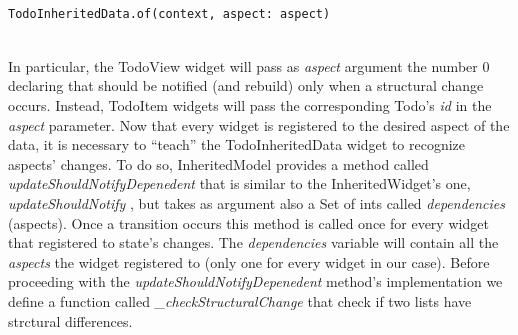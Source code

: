 \begin{code}
\label{code:2.47}
\begin{verbatim}

TodoInheritedData.of(context, aspect: aspect)
\end{verbatim}
\end{code}
\mbox{}\\
In particular, the TodoView widget will pass as \textit{aspect} argument the number 0 declaring that should be notified (and rebuild) only when a structural change occurs.
Instead, TodoItem widgets will pass the corresponding Todo’s \textit{id} in the \textit{aspect} parameter.
Now that every widget is registered to the desired aspect of the data, it is necessary to “teach” the TodoInheritedData widget to recognize aspects' changes. To do so, InheritedModel provides a method called \textit{updateShouldNotifyDepenedent} that is similar to the InheritedWidget’s one, \textit{updateShouldNotify }, but takes as argument also a Set of ints called \textit{dependencies }  (aspects). Once a transition occurs this method is called once for every widget that registered to state's changes. The \textit{dependencies }  variable will contain all the \textit{aspects} the widget registered to (only one for every widget in our case). Before proceeding with the \textit{updateShouldNotifyDepenedent} method's implementation we define a function called \textit{\_checkStructuralChange} that check if two lists have strctural differences.
\mbox{}\\

